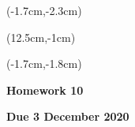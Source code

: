 \documentclass[12pt, oneside]{article}
\begin{document}
\begin{textblock*}{4cm}(-1.7cm,-2.3cm)
\end{textblock*}

\begin{textblock*}{8cm}(12.5cm,-1cm)
\end{textblock*}
\begin{textblock*}{13.5cm}(-1.7cm,-1.8cm)
\end{textblock*}

\vspace{1cm}

\begin{center}
\textbf{\Large Homework 10}

\textbf{Due 3 December 2020}
\end{center}
\end{document}
